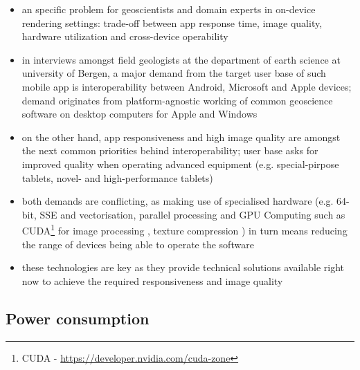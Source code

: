 \documentclass[review]{elsarticle}
\begin{document}
\begin{itemize}
\item an specific problem for geoscientists and domain experts in on-device rendering settings: trade-off between app response time, image quality, hardware utilization and cross-device operability
\item in interviews amongst field geologists at the department of earth science at university of Bergen, a major demand from the target user base of such mobile app is interoperability between Android, Microsoft and Apple devices; demand originates from platform-agnostic working of common geoscience software on desktop computers for Apple and Windows
\item on the other hand, app responsiveness and high image quality are amongst the next common priorities behind interoperability; user base asks for improved quality when operating advanced equipment (e.g. special-pirpose tablets, novel- and high-performance tablets)
\item both demands are conflicting, as making use of specialised hardware (e.g. 64-bit, \gls{SSE} and vectorisation, parallel processing and \gls{GPU} Computing such as CUDA\footnote{CUDA - \url{https://developer.nvidia.com/cuda-zone}} for image processing \cite{Heymann2007,Hudelist2014}, texture compression \cite{Chait2015}) in turn means reducing the range of devices being able to operate the software
\item these technologies are key as they provide technical solutions available right now to achieve the required responsiveness and image quality
\end{itemize}

%

\subsection{Power consumption}
\end{document}

